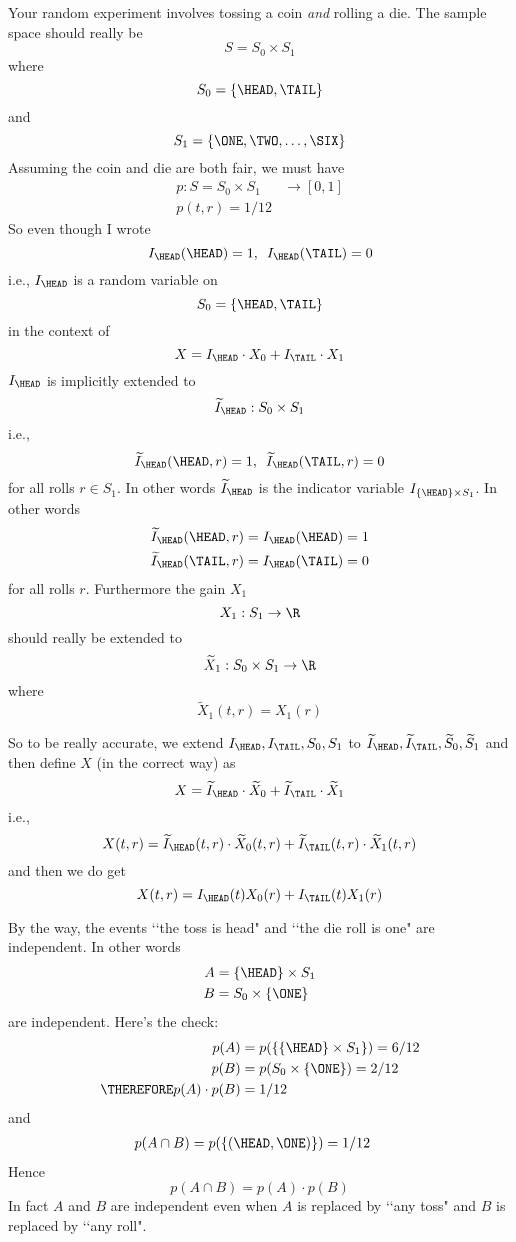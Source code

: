 Your random experiment
involves
tossing a coin \textit{and}
rolling a die.
The sample space should really be
\[
  S = S_0 \times S_1
\]
where
\[
  S_0 = \{ \HEAD, \TAIL \}
\]
and
\[
  S_1 = \{ \ONE, \TWO, \ldots, \SIX \}
\]
Assuming the coin and die are both fair,
we must have
\begin{align*}
  p : S = S_0 \times S_1 &\rightarrow [0,1] \\
  p(t, r) = 1/12
\end{align*}
So even though I wrote
\[
  I_{\HEAD}(\HEAD) = 1, \,\,\,
  I_{\HEAD}(\TAIL) = 0
\]
i.e., $I_{\HEAD}$ is a random variable on
\[
  S_0 = \{ \HEAD, \TAIL \}
\]
in the context of
\[
  X = I_{\HEAD} \cdot X_0 + I_{\TAIL} \cdot X_1
\]
$I_{\HEAD}$ is implicitly extended to
\[
  \widetilde{I}_{\HEAD} : S_0 \times S_1
\]
i.e.,
\[
 \widetilde{I}_{\HEAD}(\HEAD, r) = 1, \,\,\,
  \widetilde{I}_{\HEAD}(\TAIL, r) = 0
\]
for all rolls $r \in S_1$.
In other words
$\widetilde{I}_{\HEAD}$ is the indicator
variable
$I_{\{\HEAD\} \times S_1}$.
In other words
\begin{align*}
  \widetilde{I}_{\HEAD}(\HEAD, r) &= I_{\HEAD}(\HEAD) = 1 \\
  \widetilde{I}_{\HEAD}(\TAIL, r) &= I_{\HEAD}(\TAIL) = 0 
\end{align*}
for all rolls $r$.
Furthermore the gain $X_1$
\[
  X_1 : S_1 \rightarrow \R
\]
should really be extended to
\[
  \widetilde{X}_1 : S_0 \times S_1 \rightarrow \R
\]
where
\[
  \widetilde{X}_1(t, r) = X_1(r)
\]

So to be really accurate,
we extend
$I_{\HEAD}, I_{\TAIL}, S_0, S_1$
to
$\widetilde{I}_{\HEAD}, \widetilde{I}_{\TAIL}, \widetilde{S}_0, \widetilde{S}_1$
and then define $X$ (in the correct way) as
\[
  X
  =
  \widetilde{I}_{\HEAD} \cdot \widetilde{X}_0
  +
  \widetilde{I}_{\TAIL} \cdot \widetilde{X}_1
\]
i.e.,
\[
  X(t, r)
  =
  \widetilde{I}_{\HEAD}(t, r) \cdot \widetilde{X}_0(t, r)
  +
  \widetilde{I}_{\TAIL}(t, r) \cdot \widetilde{X}_1(t, r)
\]
and then we do get
\[
  X(t, r)
  =
  I_{\HEAD}(t) X_0(r)
  +
  I_{\TAIL}(t) X_1(r)
\]

By the way, the events \lq\lq the toss is head"
and \lq\lq the die roll is one" are independent.
In other words
\begin{align*}
  A &= \{ \HEAD \} \times S_1 \\
  B &= S_0 \times \{ \ONE \} 
\end{align*}
are independent.
Here's the check:
\begin{align*}
  p(A)
  &= p(\{ \{ \HEAD \} \times S_1 \}) = 6/12
  \\
  p(B)
  &= p( S_0 \times \{ \ONE \} ) = 2/12
  \\
  \THEREFORE
  p(A) \cdot p(B) &= 1/12
\end{align*}
and
\begin{align*}
  p(A \cap B)
  &= p(\{(\HEAD, \ONE)\}) = 1/12
\end{align*}
Hence
\[
  p(A \cap B) = p(A) \cdot p(B)
\]
In fact $A$ and $B$ are independent
even when
$A$ is replaced by \lq\lq any toss"
and 
$B$ is replaced by \lq\lq any roll".

